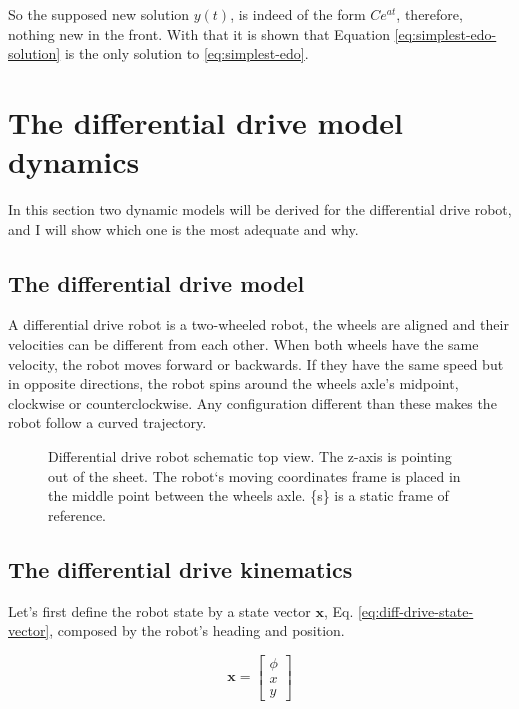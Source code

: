 \documentclass[12pt]{article}
\begin{document}
So the supposed new solution $y(t)$, is indeed of the form $C e^{at}$, therefore, nothing new in the front. With that it is shown that Equation \ref{eq:simplest-edo-solution} is the only solution to \ref{eq:simplest-edo}.


\section{The differential drive model dynamics}
In this section two dynamic models will be derived for the differential drive robot, and I will show which one is the most adequate and why.

\subsection{The differential drive model}
A differential drive robot is a two-wheeled robot, the wheels are aligned and their velocities can be different from each other. When both wheels have the same velocity, the robot moves forward or backwards. If they have the same speed but in opposite directions, the robot spins around the wheels axle's midpoint, clockwise or counterclockwise. Any configuration different than these makes the robot follow a curved trajectory.  

\begin{figure}[h]
    \centering
    
    \caption{Differential drive robot schematic top view. The z-axis is pointing out of the sheet. The robot`s moving coordinates frame is placed in the middle point between the wheels axle. \{s\} is a static frame of reference.}
    \label{fig:diff-drive-schematic}
\end{figure}

\subsection{The differential drive kinematics}
Let's first define the robot state by a state vector $\mathbf{x}$, Eq. \ref{eq:diff-drive-state-vector}, composed by the robot's heading and position.

\begin{equation}
    \mathbf{x} = \begin{bmatrix}
        \phi \\ x \\ y 
    \end{bmatrix}
    \label{eq:diff-drive-state-vector}
\end{equation}
\end{document}
